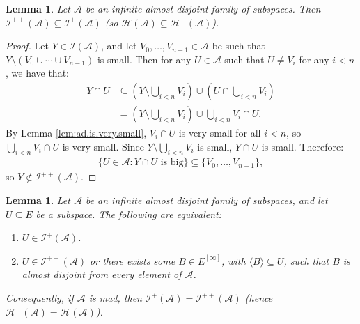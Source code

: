 \documentclass[10pt,a4paper]{amsart}
\theoremstyle{plain}
\numberwithin{equation}{section}
\newtheorem{lemma}[theorem]{Lemma}
\theoremstyle{definition}
\renewcommand{\c}[1]{\langle #1 \rangle}
\newcommand{\bb}[1]{\left( #1 \right)}
\newcommand{\cal}{\mathcal}
\newcommand{\A}{\cal{A}}
\renewcommand{\H}{\cal{H}}
\newcommand{\I}{\cal{I}}
\begin{document}
\begin{lemma}
\label{lem:plusplus.in.plus}
    Let $\A$ be an infinite almost disjoint family of subspaces. Then $\I^{++}(\A) \subseteq \I^+(\A)$ (so $\H(\A) \subseteq \H^-(\A)$).
\end{lemma}

\begin{proof}
    Let $Y \in \I(\A)$, and let $V_0,\dots,V_{n-1} \in \A$ be such that $Y \setminus (V_0 \cup \cdots \cup V_{n-1})$ is small. Then for any $U \in \A$ such that $U \neq V_i$ for any $i < n$, we have that:
    \begin{align*}
        Y \cap U &\subseteq \bb{Y \setminus \bigcup_{i<n} V_i} \cup \bb{U \cap \bigcup_{i<n} V_i} \\
        &= \bb{Y \setminus \bigcup_{i<n} V_i} \cup \bigcup_{i<n} V_i \cap U.
    \end{align*}
    By Lemma \ref{lem:ad.is.very.small}, $V_i \cap U$ is very small for all $i < n$, so $\bigcup_{i<n} V_i \cap U$ is very small. Since $Y \setminus \bigcup_{i<n} V_i$ is small, $Y \cap U$ is small. Therefore:
    \begin{align*}
        \{U \in \A : Y \cap U \text{ is big}\} \subseteq \{V_0,\dots,V_{n-1}\},
    \end{align*}
    so $Y \notin \I^{++}(\A)$. 
\end{proof}

\begin{lemma}
\label{lem:I^+(A).dichotomy}
    Let $\A$ be an infinite almost disjoint family of subspaces, and let $U \subseteq E$ be a subspace. The following are equivalent:
    \begin{enumerate}
        \item $U \in \I^+(\A)$.

        \item $U \in \I^{++}(\A)$ or there exists some $B \in E^{[\infty]}$, with $\c{B} \subseteq U$, such that $B$ is almost disjoint from every element of $\A$.
    \end{enumerate}
    Consequently, if $\A$ is mad, then $\I^+(\A) = \I^{++}(\A)$ (hence $\H^-(\A) = \H(\A)$).
\end{lemma}
\end{document}
